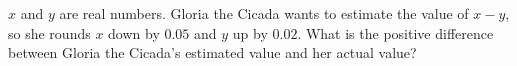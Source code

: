 $x$ and $y$ are real numbers. Gloria the Cicada wants to estimate the value of $x - y$, so she rounds $x$ down by $0.05$ and $y$ up by $0.02$. What is the positive difference between Gloria the Cicada's estimated value and her actual value?
